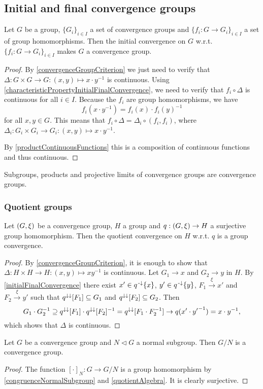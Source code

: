 \subsection{Initial and final convergence groups}
\begin{proposition} \label{initialConvergenceGroup}
Let $G$ be a group, $\{G_i\}_{i\in I}$ a set of convergence groups and $\{f_i: G \to G_i\}_{i\in I}$ a set of group homomorphisms. Then the initial convergence on $G$ w.r.t. $\{f_i: G \to G_i\}_{i\in I}$ makes $G$ a convergence group.
\end{proposition}
\begin{proof}
By \ref{convergenceGroupCriterion} we just need to verify that $\Delta: G\times G \to G: (x,y)\mapsto x\cdot y^{-1}$ is continuous. Using \ref{characteristicPropertyInitialFinalConvergence}, we need to verify that $f_i\circ \Delta$ is continuous for all $i\in I$. Because the $f_i$ are group homomorphisms, we have
\[ f_i(x\cdot y^{-1}) = f_i(x)\cdot f_i(y)^{-1} \]
for all $x, y \in G$. This means that $f_i\circ \Delta = \Delta_i \circ (f_i, f_i)$, where $\Delta_i: G_i\times G_i \to G_i: (x,y)\mapsto x\cdot y^{-1}$.

By \ref{productContinuousFunctions} this is a composition of continuous functions and thus continuous.
\end{proof}
\begin{corollary}
Subgroups, products and projective limits of convergence groups are convergence groups.
\end{corollary}

\subsubsection{Quotient groups}
\begin{proposition} \label{quotientConvergenceGroup}
Let $\left( G, \xi \right)$ be a convergence group, $H$ a group and $q: \left( G, \xi \right) \to H$ a surjective group homomorphism. Then the quotient convergence on $H$ w.r.t. $q$ is a group convergence.
\end{proposition}
\begin{proof}
By \ref{convergenceGroupCriterion}, it is enough to show that $\Delta: H\times H \to H: (x,y) \mapsto xy^{-1}$ is continuous. Let $G_1 \to x$ and $G_2 \to y$ in $H$. By \ref{initialFinalConvergence} there exist $x'\in q^{{\text{\hspace{0.15em}-}\downarrow}}\{x\}$, $y'\in q^{{\text{\hspace{0.15em}-}\downarrow}}\{y\}$, $F_1 \overset{\xi}{\longrightarrow} x'$ and $F_2 \overset{\xi}{\longrightarrow} y'$ such that $q^{\downarrow\downarrow}[F_1] \subseteq G_1$ and $q^{\downarrow\downarrow}[F_2] \subseteq G_2$. Then
\[ G_1\cdot G_2^{-1} \supseteq q^{\downarrow\downarrow}[F_1]\cdot q^{\downarrow\downarrow}[F_2]^{-1} = q^{\downarrow\downarrow}[F_1\cdot F_2^{-1}] \to q(x'\cdot {y'}^{-1}) = x\cdot y^{-1}, \]
which shows that $\Delta$ is continuous.
\end{proof}
\begin{corollary}
Let $G$ be a convergence group and $N\lhd G$ a normal subgroup. Then $G/N$ is a convergence group.
\end{corollary}
\begin{proof}
The function $[\cdot]_N: G\to G/N$ is a group homomorphism by \ref{congruenceNormalSubgroup} and \ref{quotientAlgebra}. It is clearly surjective.
\end{proof}

